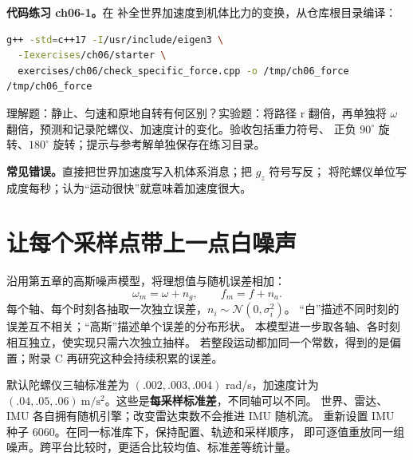 \textbf{代码练习 ch06-1。}在 
补全世界加速度到机体比力的变换，从仓库根目录编译：
\begin{lstlisting}[language=bash,numbers=none]
g++ -std=c++17 -I/usr/include/eigen3 \
  -Iexercises/ch06/starter \
  exercises/ch06/check_specific_force.cpp -o /tmp/ch06_force
/tmp/ch06_force
\end{lstlisting}
理解题：静止、匀速和原地自转有何区别？实验题：将路径 r 翻倍，再单独将
$\omega$ 翻倍，预测和记录陀螺仪、加速度计的变化。验收包括重力符号、
正负 $90^\circ$ 旋转、$180^\circ$ 旋转；提示与参考解单独保存在练习目录。

\textbf{常见错误。}直接把世界加速度写入机体系消息；把 $g_z$ 符号写反；
将陀螺仪单位写成度每秒；认为“运动很快”就意味着加速度很大。

\section{让每个采样点带上一点白噪声}
沿用第五章的高斯噪声模型，将理想值与随机误差相加：
\begin{equation}
\omega_m=\omega+n_g,\qquad f_m=f+n_a.
\end{equation}
每个轴、每个时刻各抽取一次独立误差，$n_i\sim\mathcal N(0,\sigma_i^2)$。
“白”描述不同时刻的误差互不相关；“高斯”描述单个误差的分布形状。
本模型进一步取各轴、各时刻相互独立，使实现只需六次独立抽样。
若整段运动都加同一个常数，得到的是偏置；附录 C 再研究这种会持续积累的误差。

\par\noindent\begin{minipage}{\linewidth}

\end{minipage}\par

默认陀螺仪三轴标准差为 $(.002,.003,.004)$ rad/s，加速度计为
$(.04,.05,.06)\ \mathrm{m/s^2}$。这些是\textbf{每采样标准差}，不同轴可以不同。
世界、雷达、IMU 各自拥有随机引擎；改变雷达束数不会推进 IMU 随机流。
\code{reset} 重新设置 IMU 种子 6060。在同一标准库下，保持配置、轨迹和采样顺序，
即可逐值重放同一组噪声。跨平台比较时，更适合比较均值、标准差等统计量。

